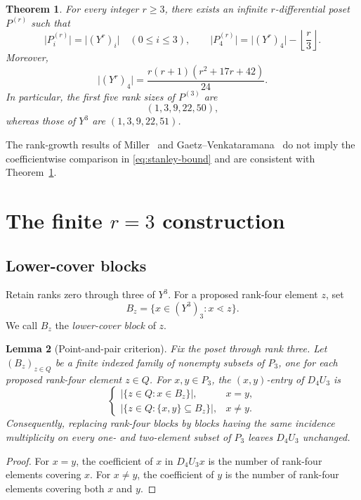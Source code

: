 \documentclass[11pt,a4paper]{amsart}
\newtheorem{theorem}{Theorem}[section]
\newtheorem{lemma}[theorem]{Lemma}
\theoremstyle{definition}
\theoremstyle{remark}
\newcommand{\card}[1]{\lvert #1\rvert}
\begin{document}
\begin{theorem}\label{thm:main}
For every integer $r\geq3$, there exists an infinite $r$-differential poset $P^{(r)}$ such that
\[
  \card{P^{(r)}_i}=\card{(Y^r)_i}\quad(0\leq i\leq3),
  \qquad
  \card{P^{(r)}_4}=\card{(Y^r)_4}-\left\lfloor\frac r3\right\rfloor.
\]
Moreover,
\begin{equation}\label{eq:Y-r-rank4}
  \card{(Y^r)_4}=\frac{r(r+1)(r^2+17r+42)}{24}.
\end{equation}
In particular, the first five rank sizes of $P^{(3)}$ are
\[
  (1,3,9,22,50),
\]
whereas those of $Y^3$ are $(1,3,9,22,51)$.
\end{theorem}

The rank-growth results of Miller~\cite{Miller2013} and Gaetz--Venkataramana~\cite{GaetzVenkataramana2020} do not imply the coefficientwise comparison in \eqref{eq:stanley-bound} and are consistent with Theorem~\ref{thm:main}.

\section{The finite \texorpdfstring{$r=3$}{r=3} construction}\label{sec:r3-construction}

\subsection{Lower-cover blocks}

Retain ranks zero through three of $Y^3$. For a proposed rank-four element $z$, set
\[
  B_z=\{x\in(Y^3)_3:x\lessdot z\}.
\]
We call $B_z$ the \emph{lower-cover block} of $z$.

\begin{lemma}[Point-and-pair criterion]\label{lem:point-pair}
Fix the poset through rank three. Let $(B_z)_{z\in Q}$ be a finite indexed family of nonempty subsets of $P_3$, one for each proposed rank-four element $z\in Q$. For $x,y\in P_3$, the $(x,y)$-entry of $D_4U_3$ is
\[
  \begin{cases}
    \card{\{z\in Q:x\in B_z\}},&x=y,\\[2mm]
    \card{\{z\in Q:\{x,y\}\subseteq B_z\}},&x\neq y.
  \end{cases}
\]
Consequently, replacing rank-four blocks by blocks having the same incidence multiplicity on every one- and two-element subset of $P_3$ leaves $D_4U_3$ unchanged.
\end{lemma}

\begin{proof}
For $x=y$, the coefficient of $x$ in $D_4U_3x$ is the number of rank-four elements covering $x$. For $x\neq y$, the coefficient of $y$ is the number of rank-four elements covering both $x$ and $y$.
\end{proof}
\end{document}
